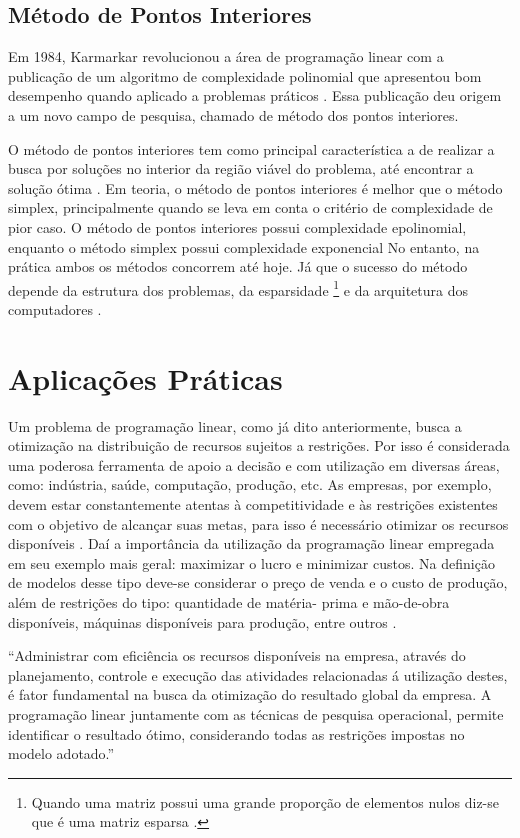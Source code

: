 \subsection{Método de Pontos Interiores}
Em 1984, Karmarkar revolucionou a área de programação linear com a publicação de um algoritmo de complexidade polinomial que apresentou bom desempenho quando aplicado a problemas práticos \cite{MaculanPI}. Essa publicação deu origem a um novo campo de pesquisa, chamado de método dos pontos interiores. 

O método de pontos interiores tem como principal característica a de realizar a busca por soluções no interior da região viável do problema, até encontrar a solução ótima \cite{Pinto}.
Em teoria, o método de pontos interiores é melhor que o método simplex, principalmente quando se leva em conta o critério de complexidade de pior caso. O método de pontos interiores possui complexidade epolinomial, enquanto o método simplex possui complexidade exponencial No entanto, na prática ambos os métodos concorrem até hoje. Já que o sucesso do método depende da estrutura dos problemas, da esparsidade \footnote{Quando uma matriz possui uma grande proporção de elementos nulos diz-se que é uma matriz esparsa \cite{Munari}.} e da arquitetura dos computadores \cite{MaculanPI}.

\section{Aplicações Práticas}
Um problema de programação linear, como já dito anteriormente, busca a otimização na distribuição de recursos sujeitos a restrições. Por isso é considerada uma poderosa ferramenta de apoio a decisão \cite{FrossardMaxMin} e com utilização em diversas áreas, como: indústria, saúde, computação, produção, etc.
As empresas, por exemplo, devem estar constantemente atentas à competitividade e às restrições existentes com o objetivo de alcançar suas metas, para isso é necessário otimizar os recursos disponíveis \cite{FrossardMaxMin}. Daí a importância da utilização da programação linear empregada em seu exemplo mais geral: maximizar o lucro e minimizar custos.  Na definição de modelos desse tipo deve-se considerar o preço de venda e o custo de produção, além de restrições do tipo: quantidade de matéria- prima e mão-de-obra disponíveis, máquinas disponíveis para produção, entre outros \cite{FrossardMaxMin}.

\begin{citacao}
“Administrar com eficiência os recursos disponíveis na empresa, através do planejamento, controle e execução das atividades relacionadas á utilização destes, é fator fundamental na busca da otimização do resultado global da empresa. A programação linear juntamente com as técnicas de pesquisa operacional, permite identificar o resultado ótimo, considerando todas as restrições impostas no modelo adotado.” \cite[p.~31]{FrossardMaxMin}
\end{citacao}

